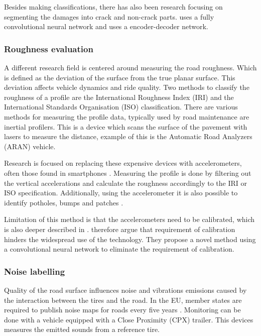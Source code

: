 Besides making classifications, there has also been research focusing on segmenting the damages into crack and non-crack parts.  uses a fully convolutional neural network and  uses a encoder-decoder network.


\subsubsection{Roughness evaluation}
A different research field is centered around measuring the road roughness. Which is defined as the deviation of the surface from the true planar surface. This deviation affects vehicle dynamics and ride quality. Two methods to classify the roughness of a profile are the International Roughness Index (IRI) \cite{Sayers1986} and the International Standards Organisation (ISO) \cite{ISO8608} classification. There are various methods for measuring the profile data, typically used by road maintenance are inertial profilers. This is a device which scans the surface of the pavement with lasers to measure the distance, example of this is the Automatic Road Analyzers (ARAN) vehicle.

Research is focused on replacing these expensive devices with accelerometers, often those found in smartphones \cite{Hanson2014,Buttlar2014,Gupta2020}. Measuring the profile is done by filtering out the vertical accelerations and calculate the roughness accordingly to the IRI or ISO specification. Additionally, using the accelerometer it is also possible to identify potholes, bumps and patches \cite{Lekshmipathy2020}. 

Limitation of this method is that the accelerometers need to be calibrated, which is also deeper described in \cite{Gupta2020}.  therefore argue that requirement of calibration hinders the widespread use of the technology. They propose a novel method using a convolutional neural network to eliminate the requirement of calibration.


\subsubsection{Noise labelling}
Quality of the road surface influences noise and vibrations emissions caused by the interaction between the tires and the road. In the EU, member states are required to publish noise maps for roads every five years \cite{EU2002}. Monitoring can be done with a vehicle equipped with a Close Proximity (CPX) trailer. This devices measures the emitted sounds from a reference tire.

